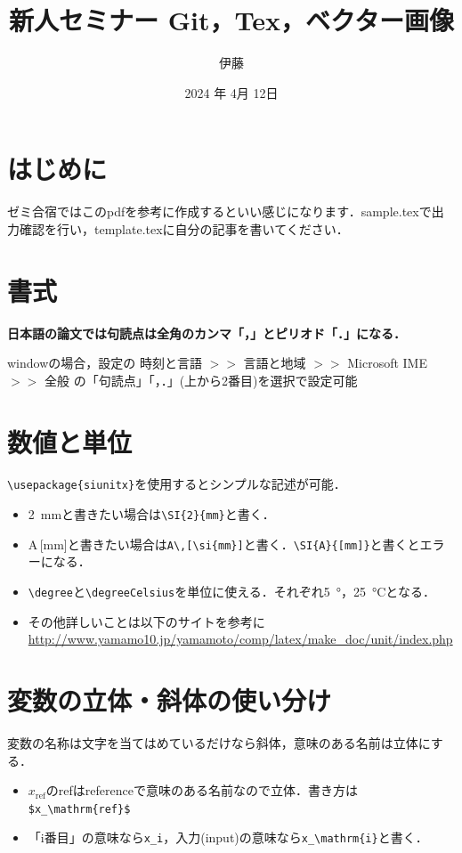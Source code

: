 \documentclass[twocolumn, a4paper]{Zemiresume}
\title{新人セミナー Git，Tex，ベクター画像 }
\date{2024 年 4月 12日}
\author{伊藤}
\begin{document}
\maketitle

\section{はじめに}
ゼミ合宿ではこのpdfを参考に作成するといい感じになります．sample.texで出力確認を行い，template.texに自分の記事を書いてください．

\section{書式}
\textbf{日本語の論文では句読点は全角のカンマ「，」とピリオド「．」になる．}

windowの場合，設定の 時刻と言語 $>>$ 言語と地域 $>>$ Microsoft IME $>>$ 全般 の「句読点」「，．」(上から2番目)を選択で設定可能

\section{数値と単位}
\verb|\usepackage{siunitx}|を使用するとシンプルな記述が可能．

\begin{itemize}
  \item \SI{2}{mm}と書きたい場合は\verb|\SI{2}{mm}|と書く．
  \item A\,[\si{mm}]と書きたい場合は\verb|A\,[\si{mm}]|と書く．\verb|\SI{A}{[mm]}|と書くとエラーになる．
  \item \verb|\degree|と\verb|\degreeCelsius|を単位に使える．それぞれ\SI{5}{\degree}，\SI{25}{\degreeCelsius}となる．
  \item その他詳しいことは以下のサイトを参考に\\
  {\footnotesize
    \url{http://www.yamamo10.jp/yamamoto/comp/latex/make_doc/unit/index.php}}
\end{itemize}
\section{変数の立体・斜体の使い分け}
変数の名称は文字を当てはめているだけなら斜体，意味のある名前は立体にする．
\begin{itemize}
  \item $x_\mathrm{ref}$のrefはreferenceで意味のある名前なので立体．書き方は\verb|$x_\mathrm{ref}$|
  \item 「i番目」の意味なら\verb|x_i|，入力(input)の意味なら\verb|x_\mathrm{i}|と書く．
\end{itemize}
\end{document}
